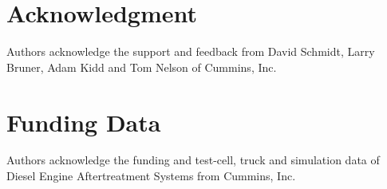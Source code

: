 \documentclass[subscriptcorrection,upint,varvw,barcolor=Goldenrod3,mathalfa=cal=euler,balance,hyphenate,french,pdf-a]{asmejour}
\begin{document}
\section*{Acknowledgment}
Authors acknowledge the support and feedback from David Schmidt, Larry Bruner, Adam Kidd and Tom Nelson of Cummins, Inc.
\section*{Funding Data}
Authors acknowledge the funding and test-cell, truck and simulation data of Diesel Engine Aftertreatment Systems from Cummins, Inc.


\appendix   %


\end{document}
